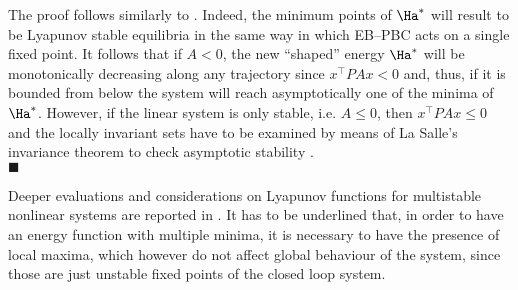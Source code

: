 %
%
\proof
The proof follows similarly to \cite{ortega2008control}. Indeed, the minimum points of $\Ha^*$ will result to be Lyapunov stable equilibria in the same way in which EB--PBC acts on a single fixed point. It follows that if $A<0$, the new ``shaped'' energy $\Ha^*$ will be monotonically decreasing along any trajectory since $x^\top PAx<0$ and, thus, if it is bounded from below the system will reach asymptotically one of the minima of $\Ha^*$. However, if the linear system is only stable, i.e. $A\leq 0$, then $x^\top PAx\leq0$ and the locally invariant sets have to be examined by means of La Salle’s invariance theorem to check asymptotic stability \cite{khalil2002nonlinear}.\\
$\blacksquare$ 
\endproof
%
\begin{rem}
	Deeper evaluations and considerations on Lyapunov functions for multistable nonlinear systems are reported in \cite{efimov2012global}. It has to be underlined that, in order to have an energy function with multiple minima, it is necessary to have the presence of local maxima, which however do not affect global behaviour of the system, since those are just unstable fixed points of the closed loop system.
	
\end{rem}
